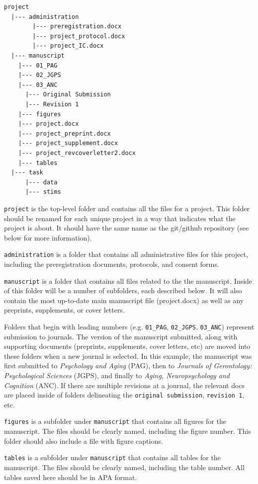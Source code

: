 \documentclass[]{book}
\begin{document}
\begin{verbatim}
project
  |--- administration 
        |--- preregistration.docx
        |--- project_protocol.docx
        |--- project_IC.docx
  |--- manuscript
    |--- 01_PAG
    |--- 02_JGPS
    |--- 03_ANC
      |--- Original Submission
      |--- Revision 1
    |--- figures
    |--- project.docx
    |--- project_preprint.docx
    |--- project_supplement.docx
    |--- project_revcoverletter2.docx
    |--- tables
  |--- task
      |--- data
      |--- stims
\end{verbatim}

\texttt{project} is the top-level folder and contains all the files for a project. This folder should be renamed for each unique project in a way that indicates what the project is about. It should have the same name as the git/github repository (see below for more information).

\texttt{administration} is a folder that contains all administrative files for this project, including the preregistration documents, protocols, and consent forms.

\texttt{manuscript} is a folder that contains all files related to the the manuscript. Inside of this folder will be a number of subfolders, each described below. It will also contain the most up-to-date main manuscript file (project.docx) as well as any preprints, supplements, or cover letters.

Folders that begin with leading numbers (e.g. \texttt{01\_PAG}, \texttt{02\_JGPS}, \texttt{03\_ANC}) represent submission to journals. The version of the manuscript submitted, along with supporting documents (preprints, supplements, cover letters, etc) are moved into these folders when a new journal is selected. In this example, the manuscript was first submitted to \emph{Psychology and Aging} (PAG), then to \emph{Journals of Gerontology: Psychological Sciences} (JGPS), and finally to \emph{Aging, Neuropsychology and Cognition} (ANC). If there are multiple revisions at a journal, the relevant docs are placed inside of folders delineating the \texttt{original\ submission}, \texttt{revision\ 1}, etc.

\texttt{figures} is a subfolder under \texttt{manuscript} that contains all figures for the manuscript. The files should be clearly named, including the figure number. This folder should also include a file with figure captions.

\texttt{tables} is a subfolder under \texttt{manuscript} that contains all tables for the manuscript. The files should be clearly named, including the table number. All tables saved here should be in APA format.
\end{document}
